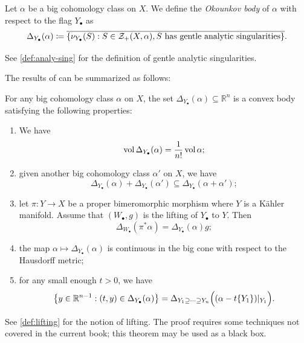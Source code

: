 \begin{definition}\label{def:tradOk}
Let $\alpha$ be a big cohomology class on $X$. We define the \emph{Okounkov body} of $\alpha$ with respect to the flag $Y_{\bullet}$ as
    \begin{equation}\label{eq:twodefspob}
        \Delta_{Y_{\bullet}}(\alpha)\coloneqq \overline{\left\{\nu_{Y_{\bullet}}(S): S\in \mathcal{Z}_+(X,\alpha),S\textup{ has gentle analytic singularities} \right\}}.
    \end{equation}
\end{definition}
See \cref{def:analy-sing} for the definition of gentle analytic singularities.

The results of \cite{DRWNXZ} can be summarized as follows:
\begin{theorem}\label{thm:Okounkovtranmain}
    For any big cohomology class $\alpha$ on $X$, the set $\Delta_{Y_{\bullet}}(\alpha)\subseteq \mathbb{R}^n$ is a convex body satisfying the following properties:
    \begin{enumerate}
        \item\label{itm:thm:Okounkovtranmain:1} We have
        \[
        \operatorname{vol} \Delta_{Y_{\bullet}}(\alpha)=\frac{1}{n!}\operatorname{vol} \alpha;
        \]
        \item\label{itm:thm:Okounkovtranmain:2} given another big cohomology class $\alpha'$ on $X$, we have
        \[
        \Delta_{Y_{\bullet}}(\alpha)+\Delta_{Y_{\bullet}}(\alpha')\subseteq \Delta_{Y_{\bullet}}(\alpha+\alpha');
        \]
        \item\label{itm:thm:Okounkovtranmain:3} let $\pi\colon Y\rightarrow X$ be a proper bimeromorphic morphism where $Y$ is a Kähler manifold. Assume that $(W_{\bullet},g)$ is the lifting of $Y_{\bullet}$ to $Y$. Then
        \[
        \Delta_{W_{\bullet}}(\pi^*\alpha)=\Delta_{Y_{\bullet}}(\alpha)g;
        \]
        \item\label{itm:thm:Okounkovtranmain:4} the map $\alpha\mapsto \Delta_{Y_{\bullet}}(\alpha)$ is continuous in the big cone with respect to the Hausdorff metric;
        \item\label{itm:thm:Okounkovtranmain:5} for any small enough $t>0$, we have
        \[
            \left\{ y\in \mathbb{R}^{n-1}: (t,y)\in \Delta_{Y_{\bullet}}(\alpha) \right\}=\Delta_{Y_1\supseteq \cdots \supseteq Y_n}\Bigl((\alpha-t\{Y_1\})|_{Y_1}\Bigr).
        \]
    \end{enumerate}
\end{theorem}
See \cref{def:lifting} for the notion of lifting. The proof requires some techniques not covered in the current book; this theorem may be used as a black box.

